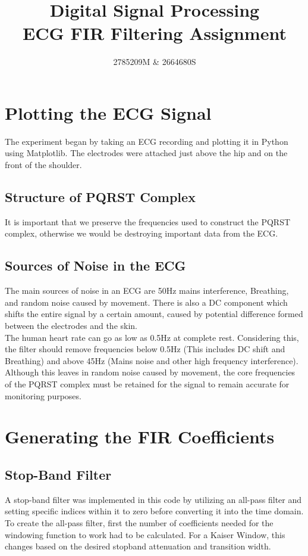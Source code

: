 \documentclass[8pt]{extarticle}
\title{Digital Signal Processing \\ ECG FIR Filtering Assignment}
\author{2785209M \& 2664680S}
\date{}
\begin{document}
\twocolumn[\maketitle]


\section{Plotting the ECG Signal}
The experiment began by taking an ECG recording and plotting it in Python using Matplotlib. The electrodes were attached just above the hip and on the front of the shoulder.

\subsection{Structure of PQRST Complex}

It is important that we preserve the frequencies used to construct the PQRST complex, otherwise we would be destroying important data from the ECG\@. 

\subsection{Sources of Noise in the ECG}

The main sources of noise in an ECG are 50Hz mains interference, Breathing, and random noise caused by movement.
There is also a DC component which shifts the entire signal by a certain amount, caused by potential difference formed between the electrodes and the skin.\\
The human heart rate can go as low as 0.5Hz at complete rest. Considering this, the filter should remove frequencies below 0.5Hz (This includes DC shift and Breathing) and above 45Hz (Mains noise and other high frequency interference).
Although this leaves in random noise caused by movement, the core frequencies of the PQRST complex must be retained for the signal to remain accurate for monitoring purposes.

\section{Generating the FIR Coefficients}

\subsection{Stop-Band Filter}
A stop-band filter was implemented in this code by utilizing an all-pass filter and setting specific indices within it to zero before converting it into the time domain.\\
To create the all-pass filter, first the number of coefficients needed for the windowing function to work had to be calculated. For a Kaiser Window, this changes based on the desired stopband attenuation and transition width.
\end{document}
